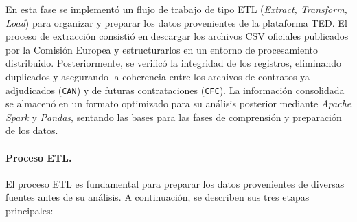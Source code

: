 \documentclass[a4paper,fleqn]{cas-sc}
\begin{document}
En esta fase se implementó un flujo de trabajo de tipo ETL (\textit{Extract, Transform, Load}) para organizar y preparar los datos provenientes de la plataforma TED. %
El proceso de extracción consistió en descargar los archivos CSV oficiales publicados por la Comisión Europea y estructurarlos en un entorno de procesamiento distribuido. 
Posteriormente, se verificó la integridad de los registros, eliminando duplicados y asegurando la coherencia entre los archivos de contratos ya adjudicados (\texttt{CAN}) y de futuras contrataciones (\texttt{CFC}). 
La información consolidada se almacenó en un formato optimizado para su análisis posterior mediante \textit{Apache Spark} y \textit{Pandas}, sentando las bases para las fases de comprensión y preparación de los datos.

\paragraph{\textbf{Proceso ETL.}}\label{sec:etl}

El proceso ETL es fundamental para preparar los datos provenientes de diversas fuentes antes de su análisis. 
A continuación, se describen sus tres etapas principales:
\end{document}
